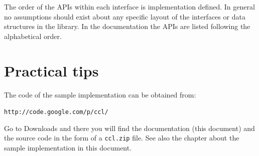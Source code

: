 The order of the APIs within each interface is implementation defined. In general no assumptions should 
exist about any specific layout of the interfaces or data structures in the library. In the documentation
the APIs are listed following the alphabetical order.

\section{Practical tips}
The code of the sample implementation can be obtained from:

\noindent\verb,http://code.google.com/p/ccl/,

Go to Downloads and there you will find the documentation (this document) and the source code in the form of a \verb,ccl.zip, file.
 See also the chapter about the sample implementation in this document.

